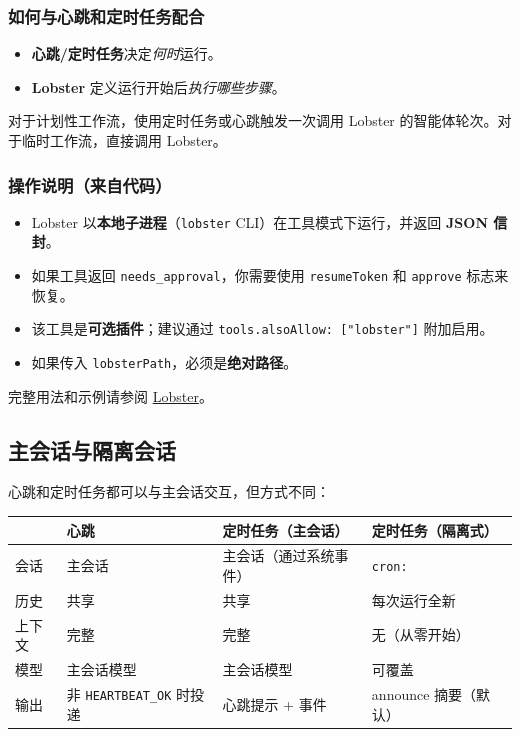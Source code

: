 \subsubsection{如何与心跳和定时任务配合}


\begin{itemize}
  \item \textbf{心跳/定时任务}决定\textit{何时}运行。
  \item \textbf{Lobster} 定义运行开始后\textit{执行哪些步骤}。
\end{itemize}


对于计划性工作流，使用定时任务或心跳触发一次调用 Lobster 的智能体轮次。对于临时工作流，直接调用 Lobster。

\subsubsection{操作说明（来自代码）}


\begin{itemize}
  \item Lobster 以\textbf{本地子进程}（\texttt{lobster} CLI）在工具模式下运行，并返回 \textbf{JSON 信封}。
  \item 如果工具返回 \texttt{needs\_approval}，你需要使用 \texttt{resumeToken} 和 \texttt{approve} 标志来恢复。
  \item 该工具是\textbf{可选插件}；建议通过 \texttt{tools.alsoAllow: ["lobster"]} 附加启用。
  \item 如果传入 \texttt{lobsterPath}，必须是\textbf{绝对路径}。
\end{itemize}


完整用法和示例请参阅 \href{/tools/lobster}{Lobster}。

\subsection{主会话与隔离会话}


心跳和定时任务都可以与主会话交互，但方式不同：


\begin{table}[h]
\centering
\small
\begin{tabular}{|l|l|l|l|}
\hline
 & 心跳 & 定时任务（主会话） & 定时任务（隔离式） \\
\hline
会话 & 主会话 & 主会话（通过系统事件） & \texttt{cron:} \\
\hline
历史 & 共享 & 共享 & 每次运行全新 \\
\hline
上下文 & 完整 & 完整 & 无（从零开始） \\
\hline
模型 & 主会话模型 & 主会话模型 & 可覆盖 \\
\hline
输出 & 非 \texttt{HEARTBEAT\_OK} 时投递 & 心跳提示 + 事件 & announce 摘要（默认） \\
\hline
\end{tabular}
\end{table}



